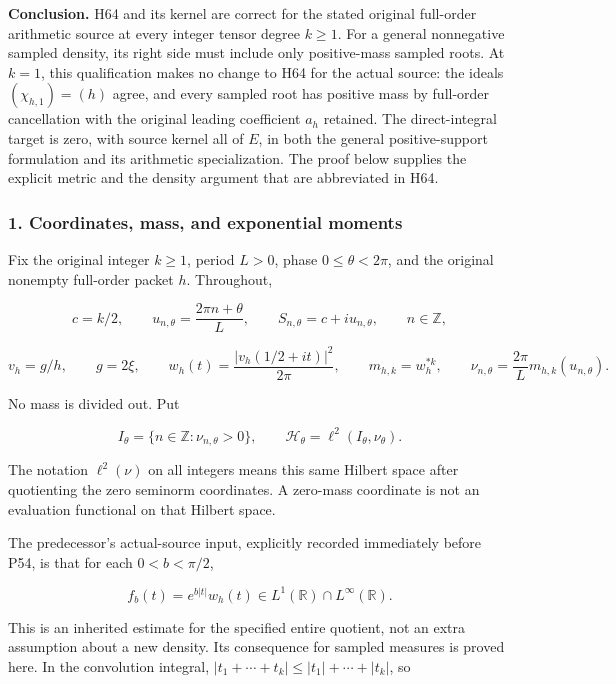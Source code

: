 \textbf{Conclusion.} H64 and its kernel are correct for the stated original full-order arithmetic source at every integer tensor degree \(k \ge 1\). For a general nonnegative sampled density, its right side must include only positive-mass sampled roots. At \(k = 1\), this qualification makes no change to H64 for the actual source: the ideals \((\chi_{h,1})=(h)\) agree, and every sampled root has positive mass by full-order cancellation with the original leading coefficient \(a_h\) retained. The direct-integral target is zero, with source kernel all of \(E\), in both the general positive-support formulation and its arithmetic specialization. The proof below supplies the explicit metric and the density argument that are abbreviated in H64.

\subsubsection{1. Coordinates, mass, and exponential moments}\label{coordinates-mass-and-exponential-moments}

Fix the original integer \(k \ge 1\), period \(L > 0\), phase \(0 \le \theta < 2 \pi\), and the original nonempty full-order packet \(h\). Throughout,

\[
c=k/2,\qquad
u_{n,\theta}=\frac{2\pi n+\theta}{L},\qquad
S_{n,\theta}=c+i u_{n,\theta},\qquad n\in\mathbb Z,
\tag{CQ1}
\]

\[
v_h=g/h,\qquad g=2\xi,\qquad
w_h(t)=\frac{|v_h(1/2+it)|^2}{2\pi},\qquad
m_{h,k}=w_h^{*k},\qquad
\nu_{n,\theta}=\frac{2\pi}{L}m_{h,k}(u_{n,\theta}).
\tag{CQ2}
\]

No mass is divided out. Put

\[
I_\theta=\{n\in\mathbb Z:\nu_{n,\theta}>0\},\qquad
\mathcal H_\theta=\ell^2(I_\theta,\nu_\theta).
\tag{CQ3}
\]

The notation \(\ell^2(\nu)\) on all integers means this same Hilbert space after quotienting the zero seminorm coordinates. A zero-mass coordinate is not an evaluation functional on that Hilbert space.

The predecessor's actual-source input, explicitly recorded immediately before P54, is that for each \(0 < b < \pi/2\),

\[
f_b(t)=e^{b|t|}w_h(t)\in L^1(\mathbb R)\cap L^\infty(\mathbb R).
\tag{CQ4}
\]

This is an inherited estimate for the specified entire quotient, not an extra assumption about a new density. Its consequence for sampled measures is proved here. In the convolution integral, \(|t_1+\cdots+t_k| \le |t_1|+\cdots+|t_k|\), so


